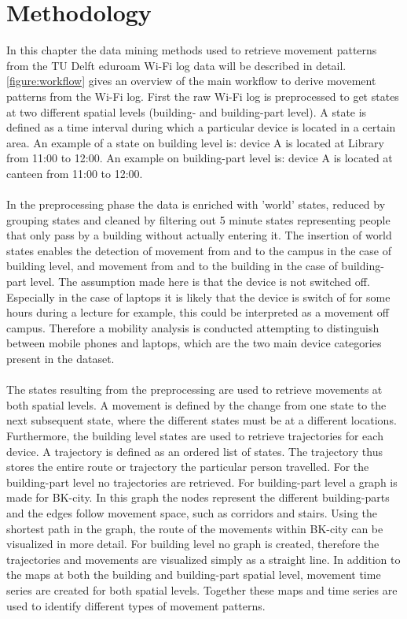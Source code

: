 \chapter{Methodology}\label{Methodology}
In this chapter the data mining methods used to retrieve movement patterns from the TU Delft eduroam Wi-Fi log data will be described in detail. \autoref{figure:workflow} gives an overview of the main workflow to derive movement patterns from the Wi-Fi log. First the raw Wi-Fi log is preprocessed to get states at two different spatial levels (building- and building-part level). A state is defined as a time interval during which a particular device is located in a certain area. An example of a state on building level is: device A is located at Library from 11:00 to 12:00. An example on building-part level is: device A is located at canteen from 11:00 to 12:00. 
\\\\
In the preprocessing phase the data is enriched with 'world' states, reduced by grouping states and cleaned by filtering out 5 minute states representing people that only pass by a building without actually entering it. The insertion of world states enables the detection of movement from and to the campus in the case of building level, and movement from and to the building in the case of building-part level. The assumption made here is that the device is not switched off. Especially in the case of laptops it is likely that the device is switch of for some hours during a lecture for example, this could be interpreted as a movement off campus. Therefore a mobility analysis is conducted attempting to distinguish between mobile phones and laptops, which are the two main device categories present in the dataset. 
\\\\
The states resulting from the preprocessing are used to retrieve movements at both spatial levels. A movement is defined by the change from one state to the next subsequent state, where the different states must be at a different locations. Furthermore, the building level states are used to retrieve trajectories for each device. A trajectory is defined as an ordered list of states. The trajectory thus stores the entire route or trajectory the particular person travelled. For the building-part level no trajectories are retrieved. For building-part level a graph is made for BK-city. In this graph the nodes represent the different building-parts and the edges follow movement space, such as corridors and stairs. Using the shortest path in the graph, the route of the movements within BK-city can be visualized in more detail. For building level no graph is created, therefore the trajectories and movements are visualized simply as a straight line. In addition to the maps at both the building and building-part spatial level, movement time series are created for both spatial levels. Together these maps and time series are used to identify different types of movement patterns.

